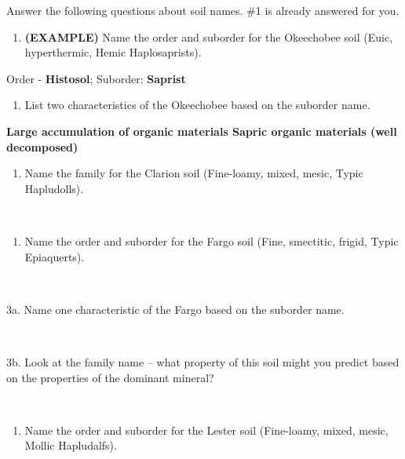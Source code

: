\documentclass[
  letterpaper,
  twocolumn,
  portrait]{scrbook}
\providecommand{\tightlist}{%
  \setlength{\itemsep}{0pt}\setlength{\parskip}{0pt}}\usepackage{longtable,booktabs,array}
\begin{document}
Answer the following questions about soil names. \#1 is already answered
for you.

\begin{enumerate}
\def\labelenumi{\arabic{enumi}.}
\tightlist
\item
  \textbf{(EXAMPLE)} Name the order and suborder for the Okeechobee soil
  (Euic, hyperthermic, Hemic Haplosaprists).
\end{enumerate}

Order - \textbf{Histosol}; Suborder: \textbf{Saprist}

\begin{enumerate}
\def\labelenumi{\alph{enumi}.}
\tightlist
\item
  List two characteristics of the Okeechobee based on the suborder name.
\end{enumerate}

\textbf{Large accumulation of organic materials Sapric organic materials
(well decomposed)}

\begin{enumerate}
\def\labelenumi{\arabic{enumi}.}
\setcounter{enumi}{1}
\tightlist
\item
  Name the family for the Clarion soil (Fine-loamy, mixed, mesic, Typic
  Hapludolls).
\end{enumerate}

~ ~ ~

\begin{enumerate}
\def\labelenumi{\arabic{enumi}.}
\setcounter{enumi}{2}
\tightlist
\item
  Name the order and suborder for the Fargo soil (Fine, smectitic,
  frigid, Typic Epiaquerts).
\end{enumerate}

~ ~ ~

3a. Name one characteristic of the Fargo based on the suborder name.

~ ~ ~

3b. Look at the family name -- what property of this soil might you
predict based on the properties of the dominant mineral?

~ ~ ~

\begin{enumerate}
\def\labelenumi{\arabic{enumi}.}
\setcounter{enumi}{3}
\tightlist
\item
  Name the order and suborder for the Lester soil (Fine-loamy, mixed,
  mesic, Mollic Hapludalfs).
\end{enumerate}

~ ~ ~
\end{document}
